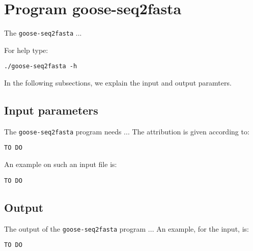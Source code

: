 \section{Program goose-seq2fasta}
The \texttt{goose-seq2fasta} ...

For help type:
\begin{lstlisting}
./goose-seq2fasta -h
\end{lstlisting}
In the following subsections, we explain the input and output paramters.

\subsection{Input parameters}

The \texttt{goose-seq2fasta} program needs ...
The attribution is given according to:
\begin{lstlisting}
TO DO
\end{lstlisting}

An example on such an input file is:
\begin{lstlisting}
TO DO
\end{lstlisting}

\subsection{Output}
The output of the \texttt{goose-seq2fasta} program ...
An example, for the input, is:
\begin{lstlisting}
TO DO
\end{lstlisting}
